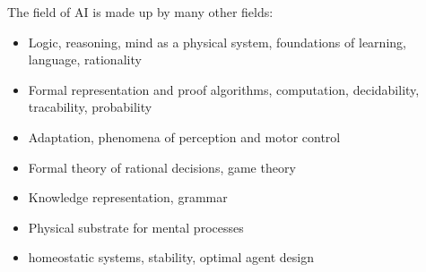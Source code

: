 \documentclass[
../../EiKI_Summary.tex,
]
{subfiles}
\begin{document}
The field of AI is made up by many other fields:
\begin{itemize}
    \item {} Logic, reasoning, mind as a physical system, foundations of learning, language, rationality
    \item {} Formal representation and proof algorithms, computation, decidability, tracability, probability
    \item {} Adaptation, phenomena of perception and motor control
    \item {} Formal theory of rational decisions, game theory
    \item {} Knowledge representation, grammar
    \item {} Physical substrate for mental processes
    \item {} homeostatic systems, stability, optimal agent design
\end{itemize}
\end{document}
